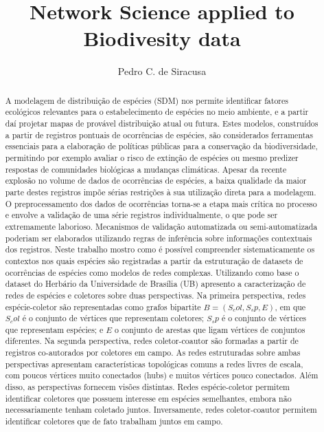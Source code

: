 \documentclass[a4paper]{article}
\title{Network Science applied to Biodivesity data}
\author{Pedro C. de Siracusa}
\begin{document}
\maketitle
\begin{abstract}
A modelagem de distribuição de espécies (SDM) nos permite identificar fatores ecológicos relevantes para o estabelecimento de espécies no meio ambiente, e a partir daí projetar mapas de provável distribuição atual ou futura. Estes modelos, construídos a partir de registros pontuais de ocorrências de espécies, são considerados ferramentas essenciais para a elaboração de políticas públicas para a conservação da biodiversidade, permitindo por exemplo avaliar o risco de extinção de espécies ou mesmo predizer respostas de comunidades biológicas a mudanças climáticas. Apesar da recente explosão no volume de dados de ocorrências de espécies, a baixa qualidade da maior parte destes registros impõe sérias restrições à sua utilização direta para a modelagem. O preprocessamento dos dados de ocorrências torna-se a etapa mais crítica no processo e envolve a validação de uma série registros individualmente, o que pode ser extremamente laborioso. Mecanismos de validação automatizada ou semi-automatizada poderiam ser elaborados utilizando regras de inferência sobre informações contextuais dos registros. Neste trabalho mostro como é possível compreender sistematicamente os contextos nos quais espécies são registradas a partir da estruturação de datasets de ocorrências de espécies como modelos de redes complexas. Utilizando como base o dataset do Herbário da Universidade de Brasília (UB) apresento a caracterização de redes de espécies e coletores sobre duas perspectivas. Na primeira perspectiva, redes espécie-coletor são representadas como grafos bipartite $B=(S_col, S_sp, E)$, em que $S_col$ é o conjunto de vértices que representam coletores; $S_sp$ é o conjunto de vértices que representam espécies; e $E$ o conjunto de arestas que ligam vértices de conjuntos diferentes.  Na segunda perspectiva, redes coletor-coautor são formadas a partir de registros co-autorados por coletores em campo. As redes estruturadas sobre ambas perspectivas apresentam características topológicas comuns a redes livres de escala, com poucos vértices muito conectados (hubs) e muitos vértices pouco conectados. Além disso, as perspectivas fornecem visões distintas. Redes espécie-coletor permitem identificar coletores que possuem interesse em espécies semelhantes, embora não necessariamente tenham coletado juntos. Inversamente, redes coletor-coautor permitem identificar coletores que de fato trabalham juntos em campo. 
\end{abstract}
\end{document}
